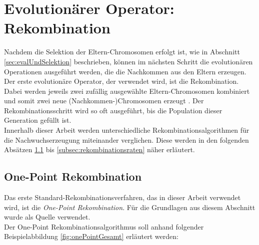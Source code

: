 \section{Evolutionärer Operator: Rekombination}
\label{sec:evolutionäreOperatoren}
Nachdem die Selektion der Eltern-Chromosomen erfolgt ist, wie in Abschnitt \ref{sec:evalUndSelektion} beschrieben, können im nächsten Schritt die evolutionären Operationen ausgeführt werden, die die Nachkommen aus den Eltern erzeugen. \\
Der erste evolutionäre Operator, der verwendet wird, ist die Rekombination.
Dabei werden jeweils zwei zufällig ausgewählte Eltern-Chromosomen kombiniert und somit zwei neue (Nachkommen-)Chromosomen erzeugt \cite{kalkreuth_comprehensive_2020}. 
Der Rekombinationsschritt wird so oft ausgeführt, bis die Population dieser Generation gefüllt ist.\\
Innerhalb dieser Arbeit werden unterschiedliche Rekombinationsalgorithmen für die Nachwuchserzeugung miteinander verglichen.
Diese werden in den folgenden Absätzen \ref{subsubsec:onePointCrossover} bis \ref{subsec:rekombinationsraten} näher erläutert.

\subsection{One-Point Rekombination}
\label{subsubsec:onePointCrossover}
Das erste Standard-Rekombinationsverfahren, das in dieser Arbeit verwendet wird, ist die \emph{One-Point Rekombination}.
Für die Grundlagen aus diesem Abschnitt wurde \cite{pavai_survey_2017} als Quelle verwendet.\\
Der One-Point Rekombinationsalgorithmus soll anhand folgender Beispielabbildung \ref{fig:onePointGesamt} erläutert werden:

